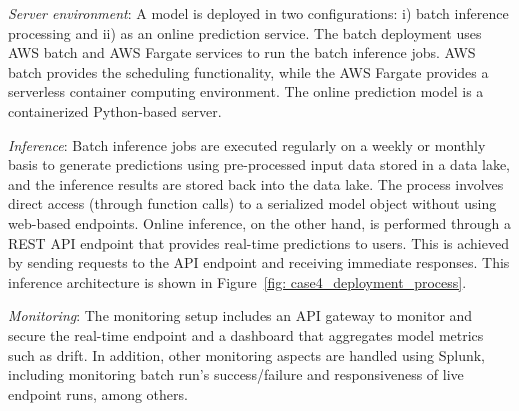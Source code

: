 \textit{Server environment}: A model is deployed in two configurations: i) batch inference processing and ii) as an online prediction service. The batch deployment uses AWS batch and AWS Fargate services to run the batch inference jobs. AWS batch provides the scheduling functionality, while the AWS Fargate provides a serverless container computing environment. The online prediction model is a containerized Python-based server. 

\textit{Inference}: Batch inference jobs are executed regularly on a weekly or monthly basis to generate predictions using pre-processed input data stored in a data lake, and the inference results are stored back into the data lake. The process involves direct access (through function calls) to a serialized model object without using web-based endpoints.
Online inference, on the other hand, is performed through a REST API endpoint that provides real-time predictions to users. This is achieved by sending requests to the API endpoint and receiving immediate responses. This inference architecture is shown in Figure~\ref{fig: case4_deployment_process}.

\textit{Monitoring}: The monitoring setup includes an API gateway to monitor and secure the real-time endpoint and a dashboard that aggregates model metrics such as drift. In addition, other monitoring aspects are handled using Splunk, including monitoring batch run’s success/failure and responsiveness of live endpoint runs, among others.
